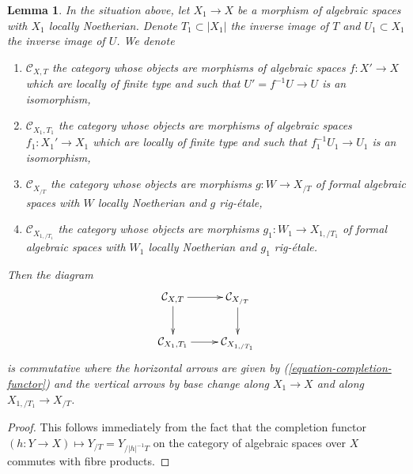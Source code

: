 \documentclass[10pt,a4paper]{amsart}
\theoremstyle{plain}
\newtheorem{lemma}[subsection]{Lemma}
\theoremstyle{definition}
\theoremstyle{remark}
\numberwithin{equation}{subsection}
\begin{document}
\begin{lemma}
\label{lemma-functoriality-completion-functor}
In the situation above, let $X_1 \to X$ be a morphism of algebraic
spaces with $X_1$ locally Noetherian. Denote $T_1 \subset |X_1|$
the inverse image of $T$ and $U_1 \subset X_1$ the inverse image of $U$.
We denote
\begin{enumerate}
\item $\mathcal{C}_{X, T}$ the category whose objects are
morphisms of algebraic spaces $f : X' \to X$ which are locally
of finite type and such that $U' = f^{-1}U \to U$ is an isomorphism,
\item $\mathcal{C}_{X_1, T_1}$ the category whose objects are
morphisms of algebraic spaces $f_1 : X_1' \to X_1$ which are locally
of finite type and such that $f_1^{-1}U_1 \to U_1$ is an isomorphism,
\item $\mathcal{C}_{X_{/T}}$ the category whose objects are
morphisms $g : W \to X_{/T}$ of formal algebraic spaces
with $W$ locally Noetherian and $g$ rig-\'etale,
\item $\mathcal{C}_{X_{1, /T_1}}$ the category whose objects are
morphisms $g_1 : W_1 \to X_{1, /T_1}$ of formal algebraic spaces
with $W_1$ locally Noetherian and $g_1$ rig-\'etale.
\end{enumerate}
Then the diagram
$$
\xymatrix{
\mathcal{C}_{X, T} \ar[d] \ar[r] &
\mathcal{C}_{X_{/T}} \ar[d] \\
\mathcal{C}_{X_1, T_1} \ar[r] &
\mathcal{C}_{X_{1, /T_1}}
}
$$
is commutative where the horizontal arrows are given by
(\ref{equation-completion-functor})
and the vertical arrows by base change along
$X_1 \to X$ and along $X_{1, /T_1} \to X_{/T}$.
\end{lemma}

\begin{proof}
This follows immediately from the fact that the completion functor
$(h : Y \to X) \mapsto Y_{/T} = Y_{/|h|^{-1}T}$
on the category of algebraic spaces over $X$
commutes with fibre products.
\end{proof}
\end{document}
